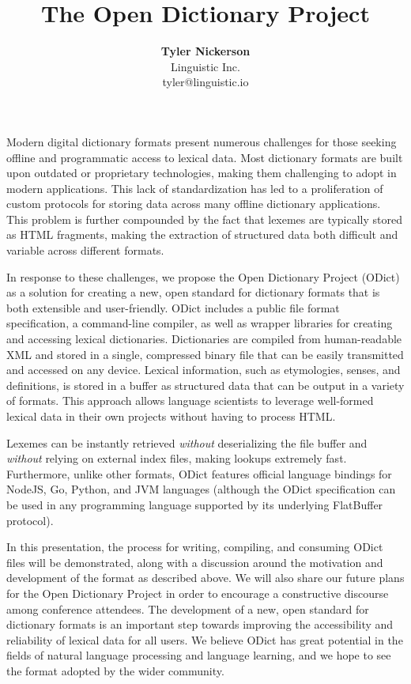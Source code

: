 \documentclass{article}
\begin{document}
\title{\textbf{The Open Dictionary Project}}
\author{\textbf{Tyler Nickerson} \\ \small{Linguistic Inc.} \\ \small{tyler@linguistic.io}}
\date{}
\maketitle
Modern digital dictionary formats present numerous challenges for those seeking offline and programmatic access to lexical data. Most dictionary formats are built upon outdated or proprietary technologies, making them challenging to adopt in modern applications. This lack of standardization has led to a proliferation of custom protocols for storing data across many offline dictionary applications. This problem is further compounded by the fact that lexemes are typically stored as HTML fragments, making the extraction of structured data both difficult and variable across different formats.

In response to these challenges, we propose the Open Dictionary Project (ODict) as a solution for creating a new, open standard for dictionary formats that is both extensible and user-friendly. ODict includes a public file format specification, a command-line compiler, as well as wrapper libraries for creating and accessing lexical dictionaries. Dictionaries are compiled from human-readable XML and stored in a single, compressed binary file that can be easily transmitted and accessed on any device. Lexical information, such as etymologies, senses, and definitions, is stored in a buffer as structured data that can be output in a variety of formats. This approach allows language scientists to leverage well-formed lexical data in their own projects without having to process HTML.

Lexemes can be instantly retrieved \emph{without} deserializing the file buffer and \emph{without} relying on external index files, making lookups extremely fast. Furthermore, unlike other formats, ODict features official language bindings for NodeJS, Go, Python, and JVM languages (although the ODict specification can be used in any programming language supported by its underlying FlatBuffer protocol).

In this presentation, the process for writing, compiling, and consuming ODict files will be demonstrated, along with a discussion around the motivation and development of the format as described above. We will also share our future plans for the Open Dictionary Project in order to encourage a constructive discourse among conference attendees. The development of a new, open standard for dictionary formats is an important step towards improving the accessibility and reliability of lexical data for all users. We believe ODict has great potential in the fields of natural language processing and language learning, and we hope to see the format adopted by the wider community.
\end{document}
